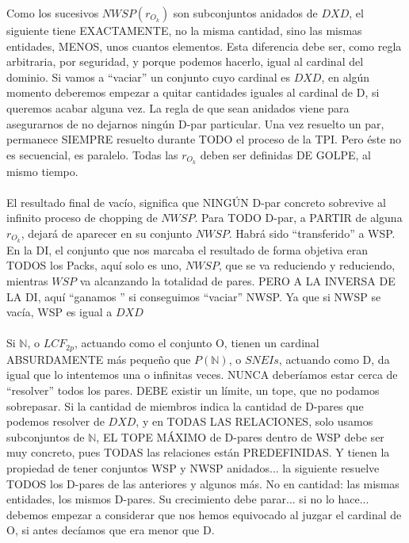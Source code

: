 	\noindent
	Como los sucesivos $NWSP(r_{O_{k}})$ son subconjuntos anidados de $DXD$, el siguiente tiene EXACTAMENTE, no la misma cantidad, sino las mismas entidades, MENOS, unos cuantos elementos. Esta diferencia debe ser, como regla arbitraria, por seguridad, y porque podemos hacerlo, igual al cardinal del dominio. Si vamos a ``vaciar'' un conjunto cuyo cardinal es $DXD$, en algún momento deberemos empezar a quitar cantidades iguales al cardinal de D, si queremos acabar alguna vez. La regla de que sean anidados viene para asegurarnos de no dejarnos ningún D-par particular. Una vez resuelto un par, permanece SIEMPRE resuelto durante TODO el proceso de la TPI. Pero éste no es secuencial, es paralelo. Todas las $r_{O_{k}}$ deben ser definidas DE GOLPE, al mismo tiempo.
	\\\\
	
	\noindent
	El resultado final de vacío, significa que NINGÚN D-par concreto sobrevive al infinito proceso de chopping de $NWSP$. Para TODO D-par, a PARTIR de alguna $r_{O_{k}}$, dejará de aparecer en su conjunto $NWSP$. Habrá sido ``transferido'' a WSP. En la DI, el conjunto que nos marcaba el resultado de forma objetiva eran TODOS los Packs, aquí solo es uno, $NWSP$, que se va reduciendo y reduciendo, mientras $WSP$ va alcanzando la totalidad de pares. PERO A LA INVERSA DE LA DI, aquí ``ganamos '' si conseguimos ``vaciar'' NWSP. Ya que si NWSP se vacía, WSP es igual a $DXD$
	\\\\
	
	\noindent
	Si $\mathbb{N}$, o $LCF_{2p}$, actuando como el conjunto O, tienen un cardinal ABSURDAMENTE más pequeño que $P(\mathbb{N})$, o $SNEIs$, actuando como D, da igual que lo intentemos una o infinitas veces. NUNCA deberíamos estar cerca de ``resolver'' todos los pares. DEBE existir un límite, un tope, que no podamos sobrepasar. Si la cantidad de miembros indica la cantidad de D-pares que podemos resolver de $DXD$, y en TODAS LAS RELACIONES, solo usamos subconjuntos de $\mathbb{N}$, EL TOPE MÁXIMO de D-pares dentro de WSP debe ser muy concreto, pues TODAS las relaciones están PREDEFINIDAS. Y tienen la propiedad de tener conjuntos WSP y NWSP anidados... la siguiente resuelve TODOS los D-pares de las anteriores y algunos más. No en cantidad: las mismas entidades, los mismos D-pares. Su crecimiento debe parar... si no lo hace... debemos empezar a considerar que nos hemos equivocado al juzgar el cardinal de O, si antes decíamos que era menor que D.
	\\\\
	
